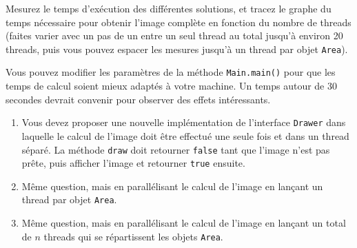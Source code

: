 Mesurez le temps d'exécution des différentes solutions, et tracez le graphe du temps nécessaire pour obtenir l'image complète en
fonction du nombre de threads (faites varier avec un pas de un entre un seul thread au total
jusqu'à environ 20 threads, puis vous pouvez espacer les mesures jusqu'à un thread par objet \lstinline{Area}).

Vous pouvez modifier les paramètres de la méthode \lstinline{Main.main()}
pour que les temps de calcul soient mieux adaptés à votre machine. Un temps autour de
30 secondes devrait convenir pour observer des effets intéressants.

\begin{enumerate}
\item Vous devez proposer une nouvelle implémentation de l'interface \lstinline{Drawer}
  dans laquelle le calcul de l'image doit être effectué une seule fois et dans un thread séparé.
  La méthode \lstinline{draw} doit retourner \lstinline{false} tant que l'image n'est pas prête,
  puis afficher l'image et retourner \lstinline{true} ensuite.

\item Même question, mais en parallélisant le calcul de l'image en lançant un thread par objet \lstinline{Area}.

\item Même question, mais en parallélisant le calcul de l'image en lançant un total de $n$ threads qui se répartissent les objets \lstinline{Area}.
\end{enumerate}

\endgroup
\endinput
